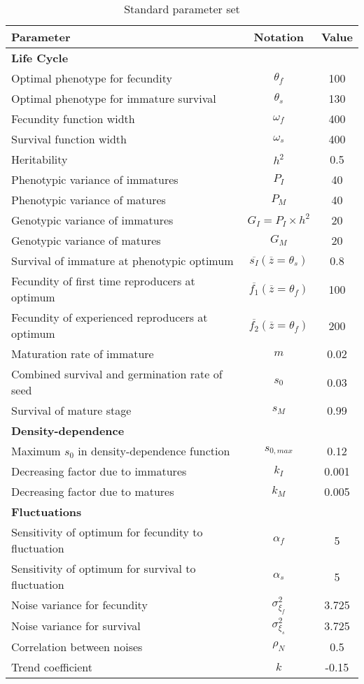 \begin{table}
\begin{center}
	\begin{tabular}{l c c}
		\hline \hline
		Parameter & Notation & Value \\
		\hline
		\multicolumn{3}{l}{\textbf{Life Cycle}} \\
		Optimal phenotype for fecundity & $\theta_{f}$ & 100 \\
		Optimal phenotype for immature survival & $\theta_{s}$ & 130 \\
		Fecundity function width & $\omega_{f}$ & 400 \\
		Survival function width & $\omega_{s}$ & 400 \\
		Heritability & $h^2$ & 0.5 \\
		Phenotypic variance of immatures & $P_{I}$ & 40 \\
		Phenotypic variance of matures & $P_{M}$ & 40 \\
		Genotypic variance of immatures & $G_{I} = P_{I} \times h^2$ & 20 \\
		Genotypic variance of matures & $G_{M}$ & 20 \\
		Survival of immature at phenotypic optimum & $\overline{s_{I}}(\overline{z} = \theta_{s})$ & 0.8 \\
		Fecundity of first time reproducers at optimum & $\overline{f_{1}}(\overline{z} = \theta_{f})$ & 100 \\
		Fecundity of experienced reproducers at optimum & $\overline{f_{2}}(\overline{z} = \theta_{f})$ & 200 \\
		Maturation rate of immature & $m$ & 0.02 \\
		Combined survival and germination rate of seed & $s_{0}$ & 0.03 \\
		Survival of mature stage & $s_{M}$ & 0.99 \\
		\multicolumn{3}{l}{\textbf{Density-dependence}} \\
		Maximum $s_{0}$ in density-dependence function & $s_{0, max}$ & 0.12 \\
		Decreasing factor due to immatures & $k_{I}$ & 0.001 \\
		Decreasing factor due to matures & $k_{M}$ & 0.005 \\
		\multicolumn{3}{l}{\textbf{Fluctuations}} \\
		Sensitivity of optimum for fecundity to fluctuation & $\alpha_{f}$ & 5 \\
		Sensitivity of optimum for survival to fluctuation & $\alpha_{s}$ & 5 \\
		Noise variance for fecundity & $\sigma_{\xi_{f}}^2$ & 3.725 \\
		Noise variance for survival & $\sigma_{\xi_{s}}^2$ & 3.725 \\
		Correlation between noises & $\rho_{N}$ & 0.5 \\
		Trend coefficient & $k$ & -0.15 \\
		\hline \hline
	\end{tabular}
	\caption{Standard parameter set}
	\label{tab:params}
\end{center}
\end{table}